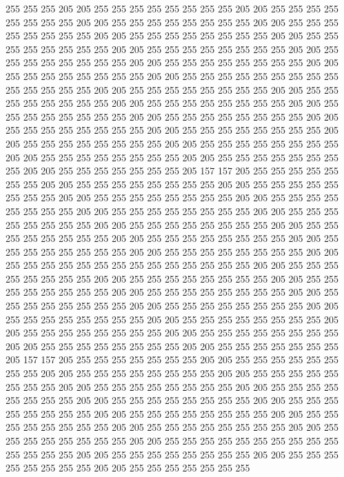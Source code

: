 255 255 255 205 205 255 255 255 255 255 255 255 255 205 205 255 255 255 255 255
255 255 255 205 205 255 255 255 255 255 255 255 255 205 205 255 255 255 255 255
255 255 255 205 205 255 255 255 255 255 255 255 255 205 205 255 255 255 255 255
255 255 255 205 205 255 255 255 255 255 255 255 255 205 205 255 255 255 255 255
255 255 255 205 205 255 255 255 255 255 255 255 255 205 205 255 255 255 255 255
255 255 255 205 205 255 255 255 255 255 255 255 255 255 255 255 255 255 255 205
205 255 255 255 255 255 255 255 255 205 205 255 255 255 255 255 255 255 255 205
205 255 255 255 255 255 255 255 255 205 205 255 255 255 255 255 255 255 255 205
205 255 255 255 255 255 255 255 255 205 205 255 255 255 255 255 255 255 255 205
205 255 255 255 255 255 255 255 255 205 205 255 255 255 255 255 255 255 255 205
205 255 255 255 255 255 255 255 255 205 205 255 255 255 255 255 255 255 255 205
205 255 255 255 255 255 255 255 255 205 205 255 255 255 255 255 255 255 205 157
157 205 255 255 255 255 255 255 255 205 205 255 255 255 255 255 255 255 255 205
205 255 255 255 255 255 255 255 255 205 205 255 255 255 255 255 255 255 255 205
205 255 255 255 255 255 255 255 255 205 205 255 255 255 255 255 255 255 255 205
205 255 255 255 255 255 255 255 255 205 205 255 255 255 255 255 255 255 255 205
205 255 255 255 255 255 255 255 255 205 205 255 255 255 255 255 255 255 255 205
205 255 255 255 255 255 255 255 255 205 205 255 255 255 255 255 255 255 255 205
205 255 255 255 255 255 255 255 255 255 255 255 255 255 255 205 205 255 255 255
255 255 255 255 255 205 205 255 255 255 255 255 255 255 255 205 205 255 255 255
255 255 255 255 255 205 205 255 255 255 255 255 255 255 255 205 205 255 255 255
255 255 255 255 255 205 205 255 255 255 255 255 255 255 255 205 205 255 255 255
255 255 255 255 255 205 205 255 255 255 255 255 255 255 255 205 205 255 255 255
255 255 255 255 255 205 205 255 255 255 255 255 255 255 255 205 205 255 255 255
255 255 255 255 255 205 205 255 255 255 255 255 255 255 205 157 157 205 255 255
255 255 255 255 255 205 205 255 255 255 255 255 255 255 255 205 205 255 255 255
255 255 255 255 255 205 205 255 255 255 255 255 255 255 255 205 205 255 255 255
255 255 255 255 255 205 205 255 255 255 255 255 255 255 255 205 205 255 255 255
255 255 255 255 255 205 205 255 255 255 255 255 255 255 255 205 205 255 255 255
255 255 255 255 255 205 205 255 255 255 255 255 255 255 255 205 205 255 255 255
255 255 255 255 255 205 205 255 255 255 255 255 255 255 255 205 205 255 255 255
255 255 255 255 255 255 255 255 255 255 255 205 205 255 255 255 255 255 255 255
255 205 205 255 255 255 255 255 255 255 255 205 205 255 255 255 255 255 255 255
